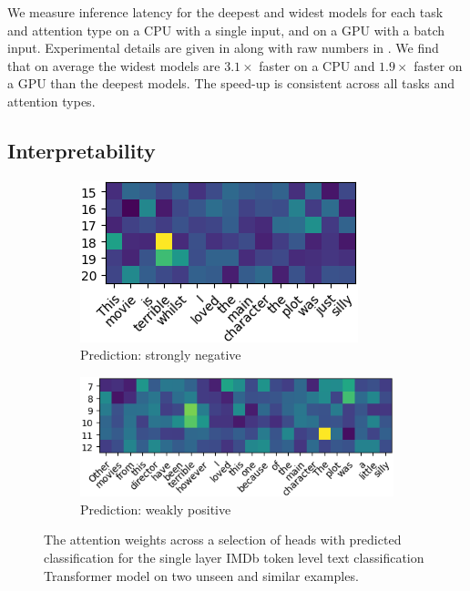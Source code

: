We measure inference latency for the deepest and widest models for each task and attention type on a CPU with a single input, and on a GPU with a batch input.
Experimental details are given in  along with raw numbers in .
We find that on average the widest models are $3.1 \times$ faster on a CPU and $1.9 \times$ faster on a GPU than the deepest models.
The speed-up is consistent across all tasks and attention types.


\subsection{Interpretability}\label{sec:disscusion:interp}

\begin{figure}[hbt]
    \centering
    \begin{subfigure}{.35\textwidth}
        \centering
        \includegraphics[height=0.12\textheight]{imgs/example_1_cropped.png}
        \caption{Prediction: strongly negative}
        \label{fig:wide_attention_1}
    \end{subfigure}
    \hspace{.05\textwidth}
    \begin{subfigure}{.55\textwidth}
        \centering
        \includegraphics[height=0.12\textheight]{imgs/example_2_cropped.png}
        \caption{Prediction: weakly positive}
        \label{fig:wide_attention_2}
    \end{subfigure}
    \caption{The attention weights across a selection of heads with predicted classification for the single layer IMDb token level text classification Transformer model on two unseen and similar examples.}
    \label{fig:wide_attention}
\end{figure}

